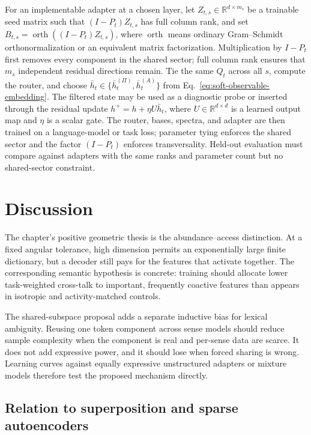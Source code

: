 \documentclass[
  aps,
  reprint,
  superscriptaddress,
  floatfix,
  nofootinbib,
  longbibliography
]{revtex4-2}
\newcommand{\R}{\mathbb{R}}
\begin{document}
For an implementable adapter at a chosen layer, let
$Z_{t,s}\in\R^{d\times m_s}$ be a trainable seed matrix such that
$(I-P_t)Z_{t,s}$ has full column rank, and set
$B_{t,s}=\operatorname{orth}((I-P_t)Z_{t,s})$, where
$\operatorname{orth}$ means ordinary Gram--Schmidt orthonormalization or an
equivalent matrix factorization.
Multiplication by $I-P_t$ first removes every component in the shared sector;
full column rank ensures that $m_s$ independent residual directions remain.
Tie the same $Q_t$ across all
$s$, compute the router, and choose
$\bar h_t\in\{\bar h_t^{(\Pi)},\bar h_t^{(A)}\}$ from
Eq.~\eqref{eq:soft-observable-embedding}.  The filtered state may be used as a
diagnostic probe or inserted through the residual update
$h^+=h+\eta U\bar h_t$, where $U\in\R^{d\times d}$ is a learned output map and
$\eta$ is a scalar gate.  The router, bases, spectra, and adapter are then trained on a
language-model or task loss; parameter tying enforces the shared sector and
the factor $(I-P_t)$ enforces transversality.  Held-out evaluation must compare
against adapters with the same ranks and parameter count but no shared-sector
constraint.

\section{Discussion}
\label{sec:discussion}

The chapter's positive geometric thesis is the abundance--access distinction.
At a fixed angular tolerance, high dimension permits an exponentially large
finite dictionary, but a decoder still pays for the features that activate
together.  The corresponding semantic hypothesis is concrete: training should
allocate lower task-weighted cross-talk to important, frequently coactive
features than appears in isotropic and activity-matched controls.

The shared-subspace proposal adds a separate inductive bias for lexical
ambiguity.  Reusing one token component across sense models should reduce
sample complexity when the component is real and per-sense data are scarce.
It does not add expressive power, and it should lose when forced sharing is
wrong.  Learning curves against equally expressive unstructured adapters or
mixture models therefore test the proposed mechanism directly.

\subsection{Relation to superposition and sparse autoencoders}
\label{sec:superposition}
\end{document}
